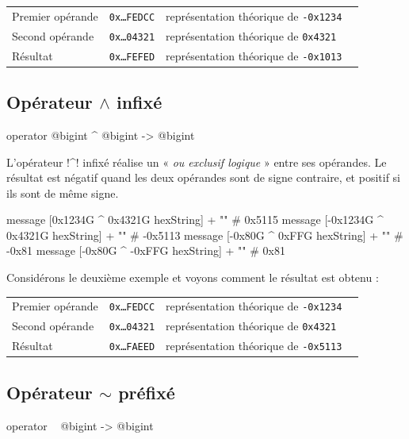 \begin{tabular}{llll}
Premier opérande & \texttt{0x…FEDCC} & représentation théorique de \texttt{-0x1234}\\
Second opérande  & \texttt{0x…04321} & représentation théorique de \texttt{0x4321} \\
Résultat & \texttt{0x…FEFED} & représentation théorique de \texttt{-0x1013} \\
\end{tabular}


\subsection{Opérateur $\wedge$ infixé}

\begin{galgas4box}
operator @bigint ^ @bigint -> @bigint
\end{galgas4box}


L'opérateur \ggsq!^! infixé réalise un « \emph{ou exclusif logique} » entre ses opérandes. Le résultat est négatif quand les deux opérandes sont de signe contraire, et positif si ils sont de même signe.

\begin{galgas4}
message [0x1234G ^ 0x4321G hexString] + "\n" # 0x5115
message [-0x1234G ^ 0x4321G hexString] + "\n" # -0x5113
message [-0x80G ^ 0xFFG hexString] + "\n" # -0x81
message [-0x80G ^ -0xFFG hexString] + "\n" # 0x81
\end{galgas4}

Considérons le deuxième exemple et voyons comment le résultat est obtenu :

\begin{tabular}{llll}
Premier opérande & \texttt{0x…FEDCC} & représentation théorique de \texttt{-0x1234}\\
Second opérande  & \texttt{0x…04321} & représentation théorique de \texttt{0x4321} \\
Résultat & \texttt{0x…FAEED} & représentation théorique de \texttt{-0x5113} \\
\end{tabular}


\subsection{Opérateur $\sim$ préfixé}

\begin{galgas4box}
operator ~ @bigint -> @bigint
\end{galgas4box}

